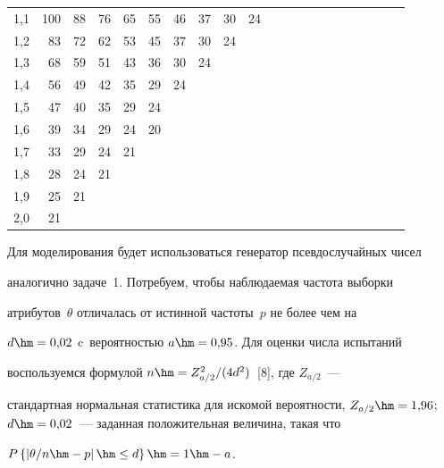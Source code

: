 \begin{table}
\begin{center}
\begin{tabular}{|c|r|r|r|r|r|r|r|r|r|r|r|c|c|c|c|c|c|c|c|c|}
1,1&100&88&76&65&55&46&37&30&24&&&&&&&&&&&\\


1,2&83&72&62&53&45&37&30&24&&&&&&&&&&&&\\


1,3&68&59&51&43&36&30&24&&&&&&&&&&&&&\\


1,4&56&49&42&35&29&24&&&&&&&&&&&&&&\\


1,5&47&40&35&29&24&&&&&&&&&&&&&&&\\


1,6&39&34&29&24&20&&&&&&&&&&&&&&&\\


1,7&33&29&24&21&&&&&&&&&&&&&&&&\\


1,8&28&24&21&&&&&&&&&&&&&&&&&\\


1,9&25&21&&&&&&&&&&&&&&&&&&\\


2,0&21&&&&&&&&&&&&&&&&&&&\\


\hline


\end{tabular}


\end{center}




\end{table}


  


  Для моделирования будет использоваться генератор псевдослучайных чисел 


аналогично задаче~1. Потребуем, чтобы наблюдаемая частота выборки 


атрибутов~$\theta$ отличалась от истинной частоты~$p$ не более чем на 


$d\hm=0{,}02$ c~вероятностью $a\hm=0{,}95$. Для оценки числа испытаний 


воспользуемся формулой $n\hm= Z^2_{a/2}/(4d^2)$~[8], где $Z_{a/2}$~--- 


стандартная нормальная статистика для искомой вероятности, $Z_{a/2}\hm= 


1{,}96$; $d\hm= 0{,}02$~--- заданная положительная величина, такая что 


$P\left\{ \left\vert \theta/n \hm- p\right\vert \hm\leq d\right\} \hm= 1\hm- a$.


